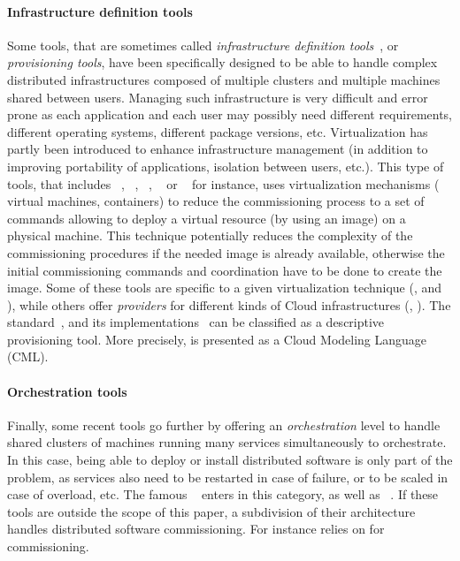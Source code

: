 \paragraph{Infrastructure definition tools}
Some tools, that are sometimes called \emph{infrastructure definition
  tools}~\cite{}, or \emph{provisioning tools}, have been specifically
designed to be able to handle complex distributed infrastructures
composed of multiple clusters and multiple machines shared between
users. Managing such infrastructure is very difficult and error prone
as each application and each user may possibly need different
requirements, different operating systems, different package versions,
etc. Virtualization has partly been introduced to enhance
infrastructure management (in addition to improving portability of
applications, isolation between users, etc.). This type of tools, that
includes \docker~\cite{docker:web}, \terraform~\cite{terraform:web},
\juju~\cite{juju:web}, \cloudformation~\cite{cloudf:web} or
\heat~\cite{heat:web} for instance, uses virtualization mechanisms (\eg
virtual machines, containers) to reduce the commissioning process to a
set of commands allowing to deploy a virtual resource (by using an image) on a
physical machine. This technique potentially reduces the complexity of
the commissioning procedures if the needed image is already available,
otherwise the initial commissioning commands and coordination have to
be done to create the image. Some of these tools are specific to a
given virtualization technique (\eg \docker, \cloudformation and
\heat), while others offer \emph{providers} for different kinds of
Cloud infrastructures (\eg \terraform, \juju). The \tosca
standard~\cite{tosca:web}, and its
implementations~\cite{Binz2013,cloudify:web,opentosca:web,8599581} can
be classified as a descriptive provisioning tool. More precisely,
\tosca is presented as a Cloud Modeling Language (CML).

\paragraph{Orchestration tools}
Finally, some recent tools go further by offering an
\emph{orchestration} level to handle shared clusters of machines
running many services simultaneously to orchestrate. In this case,
being able to deploy or install distributed software is only part of
the problem, as services also need to be restarted in case of failure, or
to be scaled in case of overload, etc. The famous
\kubernetes~\cite{kubernetes:web} enters in this category, as well as
\dockerswarm~\cite{dockerswarm:web}. If these tools are outside the
scope of this paper, a subdivision of their architecture handles
distributed software commissioning. For instance \kubernetes relies
on \docker for commissioning.


